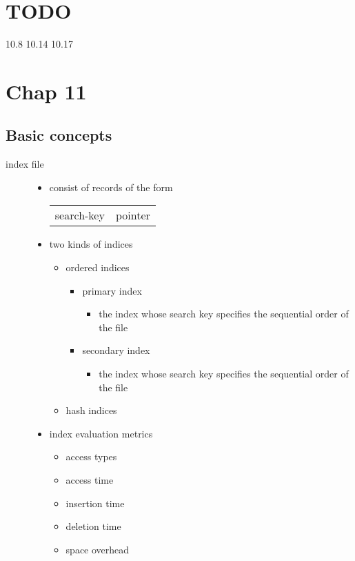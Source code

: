 \documentclass[11pt]{article}
\begin{document}
\section{{\bfseries\sffamily TODO} }
\label{sec-15}
10.8 10.14 10.17
\section{Chap 11}
\label{sec-16}
\subsection{Basic concepts}
\label{sec-16-1}
\begin{description}
\item[{index file}] \begin{itemize}
\item consist of records of the form
\begin{center}
\begin{tabular}{ll}
search-key & pointer\\
\end{tabular}
\end{center}
\item two kinds of indices
\begin{itemize}
\item ordered indices
\begin{itemize}
\item primary index
\begin{itemize}
\item the index whose search key specifies the sequential order of the file
\end{itemize}
\item secondary index
\begin{itemize}
\item the index whose search key specifies the sequential order of the file
\end{itemize}
\end{itemize}
\item hash indices
\end{itemize}
\item index evaluation metrics
\begin{itemize}
\item access types
\item access time
\item insertion time
\item deletion time
\item space overhead
\end{itemize}
\end{itemize}
\end{description}
\end{document}
